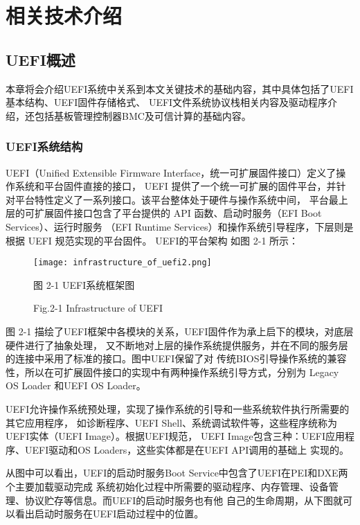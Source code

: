 %
%
\chapter{相关技术介绍}

%
%
\section{UEFI概述}
本章将会介绍UEFI系统中关系到本文关键技术的基础内容，其中具体包括了UEFI基本结构、UEFI固件存储格式、
UEFI文件系统协议栈相关内容及驱动程序介绍，还包括基板管理控制器BMC及可信计算的基础内容。

\subsection{UEFI系统结构}
UEFI（Unified Extensible Firmware Interface，统一可扩展固件接口）定义了操作系统和平台固件直接的接口，
UEFI 提供了一个统一可扩展的固件平台，并针对平台特性定义了一系列接口。该平台整体处于硬件与操作系统中间，
平台最上层的可扩展固件接口包含了平台提供的 API 函数、启动时服务（EFI  Boot  Services）、运行时服务
（EFI  Runtime Services）和操作系统引导程序\cite{english21}，下层则是根据 UEFI 规范实现的平台固件。
UEFI的平台架构
如图 2-1 所示：

\begin{figure}[htb]
    \vspace{0cm}
    \setlength{\abovecaptionskip}{0.3cm}
	\centering
    \texttt{[image: infrastructure\_of\_uefi2.png]}
    \caption*{图 2-1 UEFI系统框架图}
    \setlength{\belowcaptionskip}{-0.7cm}
    \caption*{Fig.2-1 Infrastructure of UEFI}
\end{figure}

\par 图 2-1 描绘了UEFI框架中各模块的关系，UEFI固件作为承上启下的模块，对底层硬件进行了抽象处理，
又不断地对上层的操作系统提供服务，并在不同的服务层的连接中采用了标准的接口。图中UEFI保留了对
传统BIOS引导操作系统的兼容性，所以在可扩展固件接口的实现中有两种操作系统引导方式，分别为
Legacy OS Loader 和UEFI OS Loader。 
\par UEFI允许操作系统预处理，实现了操作系统的引导和一些系统软件执行所需要的其它应用程序，
如诊断程序、UEFI Shell、系统调试软件等，这些程序统称为UEFI实体（UEFI Image）。根据UEFI规范，
UEFI Image包含三种：UEFI应用程序、UEFI驱动和OS Loaders，这些实体都是在UEFI API调用的基础上
实现的。
\par 从图中可以看出，UEFI的启动时服务Boot Service中包含了UEFI在PEI和DXE两个主要加载驱动完成
系统初始化过程中所需要的驱动程序、内存管理、设备管理、协议贮存等信息。而UEFI的启动时服务也有他
自己的生命周期，从下图就可以看出启动时服务在UEFI启动过程中的位置。

